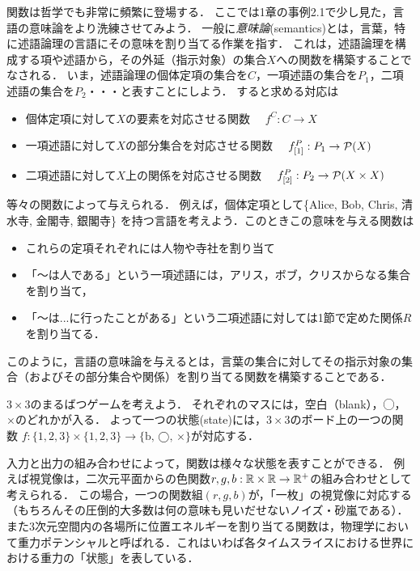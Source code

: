 \documentclass[11pt,a4paper]{jsarticle} %
\begin{document}
\begin{example}[意味論]
関数は哲学でも非常に頻繁に登場する．
ここでは1章の事例2.1で少し見た，言語の意味論をより洗練させてみよう．
一般に\emph{意味論}(semantics)とは，言葉，特に述語論理の言語にその意味を割り当てる作業を指す．
これは，述語論理を構成する項や述語から，その外延（指示対象）の集合$X$への関数を構築することでなされる．
いま，述語論理の個体定項の集合を$C$，一項述語の集合を$P_1$，二項述語の集合を$P_2$・・・と表すことにしよう．
すると求める対応は
\begin{itemize}
 \item 個体定項に対して$X$の要素を対応させる関数 \ \ $f^C: C \to X$
 \item 一項述語に対して$X$の部分集合を対応させる関数 \ \ $f^P_{[1]}: P_1 \to \mathcal{P}(X)$
 \item 二項述語に対して$X$上の関係を対応させる関数 \ \ $f^P_{[2]}: P_2 \to \mathcal{P}(X \times X)$
\end{itemize}
等々の関数によって与えられる．
例えば，個体定項として\{Alice, Bob, Chris, 清水寺, 金閣寺, 銀閣寺\} を持つ言語を考えよう．このときこの意味を与える関数は
\begin{itemize}
 \item これらの定項それぞれには人物や寺社を割り当て
 \item 「〜は人である」という一項述語には，アリス，ボブ，クリスからなる集合を割り当て，
 \item 「〜は...に行ったことがある」という二項述語に対しては1節で定めた関係$R$を割り当てる．
\end{itemize}
このように，言語の意味論を与えるとは，言葉の集合に対してその指示対象の集合（およびその部分集合や関係）を割り当てる関数を構築することである．
\end{example}

\begin{example}[状態]
$3 \times 3$のまるばつゲームを考えよう．
それぞれのマスには，空白（blank），◯，×のどれかが入る．
よって一つの状態(state)には，$3 \times 3$のボード上の一つの関数 $f:\{1, 2, 3\} \times \{1, 2, 3\} \to \{ \text{b, ◯, ×}\}$が対応する．

入力と出力の組み合わせによって，関数は様々な状態を表すことができる．
例えば視覚像は，二次元平面からの色関数$r, g, b:\mathbb{R} \times \mathbb{R} \to \mathbb{R}^+$の組み合わせとして考えられる．
この場合，一つの関数組$(r,g,b)$が，「一枚」の視覚像に対応する（もちろんその圧倒的大多数は何の意味も見いだせないノイズ・砂嵐である）．
また3次元空間内の各場所に位置エネルギーを割り当てる関数は，物理学において重力ポテンシャルと呼ばれる．これはいわば各タイムスライスにおける世界における重力の「状態」を表している．
\end{example}
\end{document}
